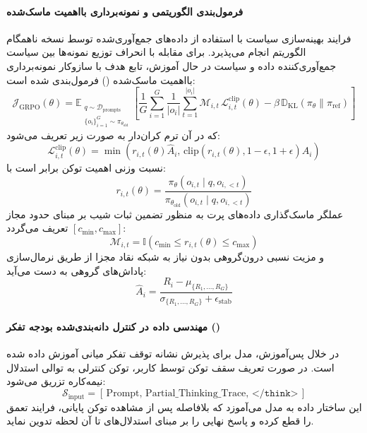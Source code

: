 \paragraph*{فرمول‌بندی الگوریتمی و نمونه‌برداری بااهمیت ماسک‌شده}
فرایند بهینه‌سازی سیاست با استفاده از داده‌های جمع‌آوری‌شده توسط نسخه ناهمگام الگوریتم  \cite{shao2024deepseekmath} انجام می‌پذیرد. برای مقابله با انحراف توزیع نمونه‌ها بین سیاست جمع‌آوری‌کننده داده و سیاست در حال آموزش، تابع هدف با سازوکار نمونه‌برداری بااهمیت ماسک‌شده () فرمول‌بندی شده است:
\begin{equation}
    \mathcal{J}_{\text{GRPO}}(\theta) = \mathbb{E}_{\substack{q \sim \mathcal{D}_{\text{prompts}} \\ \{o_i\}_{i=1}^G \sim \pi_{\theta_{\text{old}}}}} \left[ \frac{1}{G} \sum_{i=1}^G \frac{1}{|o_i|} \sum_{t=1}^{|o_i|} \mathcal{M}_{i, t} \, \mathcal{L}_{i, t}^{\text{clip}}(\theta) - \beta \, \mathbb{D}_{\text{KL}}\left(\pi_\theta \parallel \pi_{\text{ref}}\right) \right]
\end{equation}
که در آن ترم کران‌دار به صورت زیر تعریف می‌شود:
\begin{equation}
    \mathcal{L}_{i, t}^{\text{clip}}(\theta) = \min \left( r_{i, t}(\theta) \hat{A}_i, \, \text{clip}\left(r_{i, t}(\theta), 1 - \epsilon, 1 + \epsilon\right) \hat{A}_i \right)
\end{equation}
نسبت وزنی اهمیت توکن برابر است با:
\begin{equation}
    r_{i, t}(\theta) = \frac{\pi_\theta(o_{i, t} \mid q, o_{i, <t})}{\pi_{\theta_{\text{old}}}(o_{i, t} \mid q, o_{i, <t})}
\end{equation}
عملگر ماسک‌گذاری داده‌های پرت به منظور تضمین ثبات شیب بر مبنای حدود مجاز $[c_{\min}, c_{\max}]$ تعریف می‌گردد:
\begin{equation}
    \mathcal{M}_{i, t} = \mathbb{I}\left( c_{\min} \le r_{i, t}(\theta) \le c_{\max} \right)
\end{equation}
و مزیت نسبی درون‌گروهی بدون نیاز به شبکه نقاد مجزا از طریق نرمال‌سازی پاداش‌های گروهی به دست می‌آید:
\begin{equation}
    \hat{A}_i = \frac{R_i - \mu_{\{R_1, \dots, R_G\}}}{\sigma_{\{R_1, \dots, R_G\}} + \epsilon_{\text{stab}}}
\end{equation}

\paragraph*{مهندسی داده در کنترل دانه‌بندی‌شده بودجه تفکر ()}
در خلال پس‌آموزش، مدل برای پذیرش نشانه توقف تفکر میانی آموزش داده شده است. در صورت تعریف سقف توکن توسط کاربر، توکن کنترلی به توالی استدلال نیمه‌کاره تزریق می‌شود:
\begin{equation}
    \mathcal{S}_{\text{input}} = [\,\text{Prompt}, \, \text{Partial\_Thinking\_Trace}, \, \texttt{</think>}\,]
\end{equation}
این ساختار داده به مدل می‌آموزد که بلافاصله پس از مشاهده توکن پایانی، فرایند تعمق را قطع کرده و پاسخ نهایی را بر مبنای استدلال‌های تا آن لحظه تدوین نماید.

